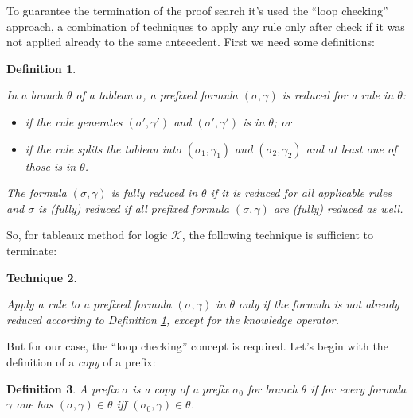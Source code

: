 \documentclass[submission,copyright,creativecommons]{eptcs}
\newtheorem{definition}{Definition}[section]
\newtheorem{technique}[definition]{Technique}
\begin{document}
            To guarantee the termination of the proof search it's used the ``loop checking'' approach, a combination of techniques to apply any rule only after check if it was not applied already to the same antecedent. First we need some definitions:
            
            \begin{definition}
                \label{def:dymaelTableauxTerminationReduced}
            
                In a branch $\theta$ of a tableau $\sigma$, a prefixed formula $(\sigma, \gamma)$ is \emph{reduced} for a rule in $\theta$:
            
                \begin{itemize}
                    \item if the rule generates $(\sigma', \gamma')$ and $(\sigma', \gamma')$ is in $\theta$; or
                    
                    \item if the rule splits the tableau into $(\sigma_1, \gamma_1)$ and $(\sigma_2, \gamma_2)$ and at least one of those is in $\theta$.
                \end{itemize}
            
                The formula $(\sigma, \gamma)$ is \emph{fully reduced} in $\theta$ if it is reduced for all applicable rules and $\sigma$ is (fully) reduced if all prefixed formula $(\sigma, \gamma)$ are (fully) reduced as well.
            \end{definition}
        
            So, for tableaux method for logic $\mathcal{K}$, the following technique is sufficient to terminate:
        
            \begin{technique}
                \label{tech:dymaelTableauxReduced}
            
                Apply a rule to a prefixed formula $(\sigma, \gamma)$ in $\theta$ only if the formula is not already reduced according to Definition \ref{def:dymaelTableauxTerminationReduced}, except for the knowledge operator.
            \end{technique}

            But for our case, the ``loop checking'' concept is required. Let's begin with the definition of a \emph{copy} of a prefix:
            
            \begin{definition}
                A prefix $\sigma$ is a copy of a prefix $\sigma_0$ for branch $\theta$ if for every formula $\gamma$ one has $(\sigma, \gamma) \in \theta$ iff $(\sigma_0, \gamma) \in \theta$.
            \end{definition}
            
\end{document}
